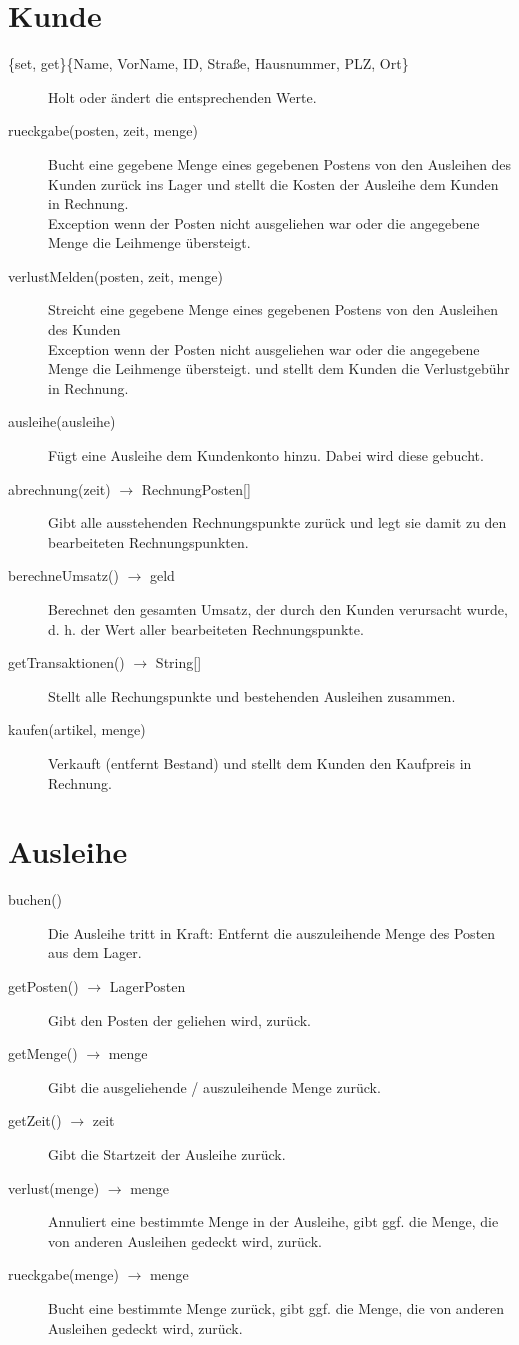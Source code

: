 \documentclass[a4paper,12pt,titlepage]{article}
\begin{document}
\section{Kunde}
\begin{description}
\item[\{set, get\}\{Name, VorName, ID, Straße, Hausnummer, PLZ, Ort\}]
Holt oder ändert die entsprechenden Werte.
\item[rueckgabe(posten, zeit, menge)]
Bucht eine gegebene Menge eines gegebenen Postens von den Ausleihen des Kunden zurück ins Lager
und stellt die Kosten der Ausleihe dem Kunden in Rechnung.\\
Exception wenn der Posten nicht ausgeliehen war oder die angegebene Menge die Leihmenge übersteigt.
\item[verlustMelden(posten, zeit, menge)]
Streicht eine gegebene Menge eines gegebenen Postens von den Ausleihen des Kunden\\
Exception wenn der Posten nicht ausgeliehen war oder die angegebene Menge die Leihmenge übersteigt.
und stellt dem Kunden die Verlustgebühr in Rechnung.
\item[ausleihe(ausleihe)]
Fügt eine Ausleihe dem Kundenkonto hinzu. Dabei wird diese gebucht.
\item[abrechnung(zeit) $\rightarrow$ RechnungPosten{[]}]
Gibt alle ausstehenden Rechnungspunkte zurück und legt sie damit zu den bearbeiteten Rechnungspunkten.
\item[berechneUmsatz() $\rightarrow$ geld]
Berechnet den gesamten Umsatz, der durch den Kunden verursacht wurde, d. h. der Wert aller bearbeiteten Rechnungspunkte.
\item[getTransaktionen() $\rightarrow$ String{[]}]
Stellt alle Rechungspunkte und bestehenden Ausleihen zusammen.
\item[kaufen(artikel, menge)]
Verkauft (entfernt Bestand) und stellt dem Kunden den Kaufpreis in Rechnung.
\end{description}
\section{Ausleihe}
\begin{description}
\item[buchen()]
Die Ausleihe tritt in Kraft: Entfernt die auszuleihende Menge des Posten aus dem Lager.
\item[getPosten() $\rightarrow$ LagerPosten]
Gibt den Posten der geliehen wird, zurück.
\item[getMenge() $\rightarrow$ menge]
Gibt die ausgeliehende / auszuleihende Menge zurück.
\item[getZeit() $\rightarrow$ zeit]
Gibt die Startzeit der Ausleihe zurück.
\item[verlust(menge) $\rightarrow$ menge]
Annuliert eine bestimmte Menge in der Ausleihe, gibt ggf. die Menge, die von anderen Ausleihen gedeckt wird, zurück.
\item[rueckgabe(menge) $\rightarrow$ menge]
Bucht eine bestimmte Menge zurück, gibt ggf. die Menge, die von anderen Ausleihen gedeckt wird, zurück.
\end{description}
\end{document}
